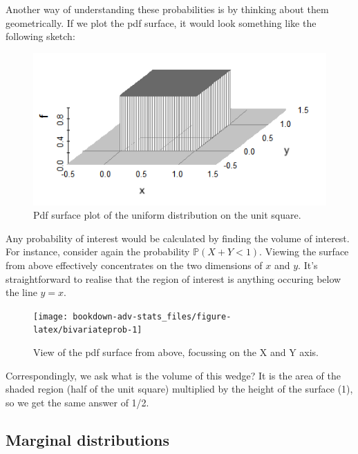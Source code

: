 \documentclass[
]{book}
\newcommand{\bbP}{\mathbb{P}}
\theoremstyle{definition}
\theoremstyle{definition}
\theoremstyle{definition}
\theoremstyle{definition}
\theoremstyle{remark}
\begin{document}
Another way of understanding these probabilities is by thinking about them geometrically.
If we plot the pdf surface, it would look something like the following sketch:

\begin{figure}

{\centering \includegraphics[width=0.8\linewidth]{figure/bivariateunif} 

}

\caption{Pdf surface plot of the uniform distribution on the unit square.}\label{fig:unnamed-chunk-10}
\end{figure}

Any probability of interest would be calculated by finding the volume of interest.
For instance, consider again the probability \(\bbP(X + Y < 1)\).
Viewing the surface from above effectively concentrates on the two dimensions of \(x\) and \(y\).
It's straightforward to realise that the region of interest is anything occuring below the line \(y=x\).

\begin{figure}

{\centering \texttt{[image: bookdown-adv-stats\_files/figure-latex/bivariateprob-1]} 

}

\caption{View of the pdf surface from above, focussing on the X and Y axis.}\label{fig:bivariateprob}
\end{figure}

Correspondingly, we ask what is the volume of this wedge?
It is the area of the shaded region (half of the unit square) multiplied by the height of the surface (1), so we get the same answer of 1/2.

\hypertarget{marginal-distributions}{%
\subsection{Marginal distributions}\label{marginal-distributions}}
\end{document}
